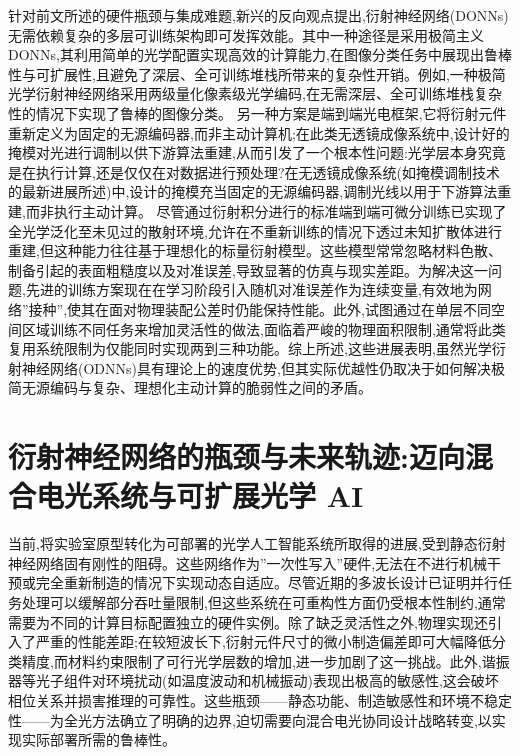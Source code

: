 针对前文所述的硬件瓶颈与集成难题,新兴的反向观点提出,衍射神经网络(DONNs)无需依赖复杂的多层可训练架构即可发挥效能。其中一种途径是采用极简主义 DONNs,其利用简单的光学配置实现高效的计算能力,在图像分类任务中展现出鲁棒性与可扩展性,且避免了深层、全可训练堆栈所带来的复杂性开销。例如,一种极简光学衍射神经网络采用两级量化像素级光学编码,在无需深层、全可训练堆栈复杂性的情况下实现了鲁棒的图像分类。\citep{doi_10_1002_lpor_202402303_1f555bd4} 另一种方案是端到端光电框架,它将衍射元件重新定义为固定的无源编码器,而非主动计算机;在此类无透镜成像系统中,设计好的掩模对光进行调制以供下游算法重建,从而引发了一个根本性问题:光学层本身究竟是在执行计算,还是仅仅在对数据进行预处理?在无透镜成像系统(如掩模调制技术的最新进展所述)中,设计的掩模充当固定的无源编码器,调制光线以用于下游算法重建,而非执行主动计算。\citep{doi_10_3390_electronics13030617_5b341306} 尽管通过衍射积分进行的标准端到端可微分训练已实现了全光学泛化至未见过的散射环境,允许在不重新训练的情况下透过未知扩散体进行重建,但这种能力往往基于理想化的标量衍射模型。这些模型常常忽略材料色散、制备引起的表面粗糙度以及对准误差,导致显著的仿真与现实差距。为解决这一问题,先进的训练方案现在在学习阶段引入随机对准误差作为连续变量,有效地为网络''接种'',使其在面对物理装配公差时仍能保持性能。此外,试图通过在单层不同空间区域训练不同任务来增加灵活性的做法,面临着严峻的物理面积限制,通常将此类复用系统限制为仅能同时实现两到三种功能。综上所述,这些进展表明,虽然光学衍射神经网络(ODNNs)具有理论上的速度优势,但其实际优越性仍取决于如何解决极简无源编码与复杂、理想化主动计算的脆弱性之间的矛盾。\citep{doi_10_1038_s41377_022_00725_8_57c4c704} \citep{doi_10_1002_lpor_202402303_1f555bd4} \citep{doi_10_48550_arxiv_2411_05748_a91b6f61} \citep{doi_10_3390_electronics13030617_5b341306} \citep{doi_10_1515_nanoph_2020_0291_c4a9f42d}

\section{衍射神经网络的瓶颈与未来轨迹:迈向混合电光系统与可扩展光学 AI}\label{ux884dux5c04ux795eux7ecfux7f51ux7edcux7684ux74f6ux9888ux4e0eux672aux6765ux8f68ux8ff9ux8fc8ux5411ux6df7ux5408ux7535ux5149ux7cfbux7edfux4e0eux53efux6269ux5c55ux5149ux5b66-ai}

当前,将实验室原型转化为可部署的光学人工智能系统所取得的进展,受到静态衍射神经网络固有刚性的阻碍。这些网络作为''一次性写入''硬件,无法在不进行机械干预或完全重新制造的情况下实现动态自适应。尽管近期的多波长设计已证明并行任务处理可以缓解部分吞吐量限制,但这些系统在可重构性方面仍受根本性制约,通常需要为不同的计算目标配置独立的硬件实例。除了缺乏灵活性之外,物理实现还引入了严重的性能差距;在较短波长下,衍射元件尺寸的微小制造偏差即可大幅降低分类精度,而材料约束限制了可行光学层数的增加,进一步加剧了这一挑战。\citep{doi_10_1109_tmag_2023_3281842_3e98eb7f}此外,谐振器等光子组件对环境扰动(如温度波动和机械振动)表现出极高的敏感性,这会破坏相位关系并损害推理的可靠性。这些瓶颈------静态功能、制造敏感性和环境不稳定性------为全光方法确立了明确的边界,迫切需要向混合电光协同设计战略转变,以实现实际部署所需的鲁棒性。\citep{doi_10_1515_nanoph_2022_0615_9a3be8d6} \citep{doi_10_1002_adpr_202300310_6647aa64} \citep{doi_10_3390_nano14080697_c372a140} \citep{doi_10_1002_nap2_70185_56c8ab30}

